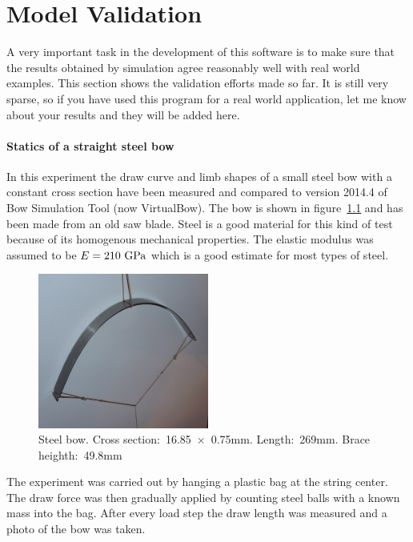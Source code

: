 \chapter{Model Validation} 

A very important task in the development of this software is to make sure that the results obtained by simulation agree reasonably well with real world examples.
This section shows the validation efforts made so far.
It is still very sparse, so if you have used this program for a real world application, let me know about your results and they will be added here.
\subsubsection{Statics of a straight steel bow}

In this experiment the draw curve and limb shapes of a small steel bow with a constant cross section have been measured and compared to version 2014.4 of Bow Simulation Tool (now VirtualBow).
The bow is shown in figure~\ref{fig:validation:setup} and has been made from an old saw blade.
Steel is a good material for this kind of test because of its homogenous mechanical properties.
The elastic modulus was assumed to be $E = 210\ \rm{GPa}$ which is a good estimate for most types of steel.

\begin{figure}[H]
\centering
\includegraphics[width=0.5\textwidth]{figures/validation/setup.png}
\caption{Steel bow. Cross section:~16.85~$\times$~0.75mm. Length:~269mm. Brace heighth:~49.8mm}
\label{fig:validation:setup}
\end{figure}

The experiment was carried out by hanging a plastic bag at the string center.
The draw force was then gradually applied by counting steel balls with a known mass into the bag.
After every load step the draw length was measured and a photo of the bow was taken.


